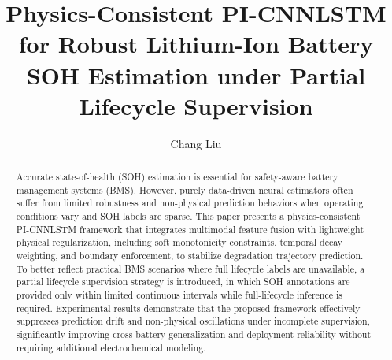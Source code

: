 \documentclass[a4paper,fleqn]{cas-dc}
\begin{document}
\let\WriteBookmarks\relax
\def\floatpagepagefraction{1}
\def\textpagefraction{.001}


\title[mode=title]{Physics-Consistent PI-CNNLSTM for Robust Lithium-Ion Battery SOH Estimation under Partial Lifecycle Supervision}


\author[1]{Chang Liu}
\cormark[1]




\begin{abstract}
Accurate state-of-health (SOH) estimation is essential for safety-aware battery management systems (BMS). However, purely data-driven neural estimators often suffer from limited robustness and non-physical prediction behaviors when operating conditions vary and SOH labels are sparse. This paper presents a physics-consistent PI-CNNLSTM framework that integrates multimodal feature fusion with lightweight physical regularization, including soft monotonicity constraints, temporal decay weighting, and boundary enforcement, to stabilize degradation trajectory prediction. To better reflect practical BMS scenarios where full lifecycle labels are unavailable, a partial lifecycle supervision strategy is introduced, in which SOH annotations are provided only within limited continuous intervals while full-lifecycle inference is required. Experimental results demonstrate that the proposed framework effectively suppresses prediction drift and non-physical oscillations under incomplete supervision, significantly improving cross-battery generalization and deployment reliability without requiring additional electrochemical modeling.
\end{abstract}
\end{document}

